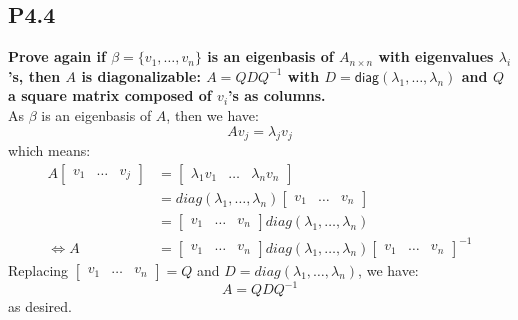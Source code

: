 \documentclass[12pt]{article}
\begin{document}
\subsection*{P4.4}
\textbf{Prove again if $\beta = \{v_1,\dots,v_n\}$ is an eigenbasis of $A_{n\times n}$ with eigenvalues $\lambda_i$'s, then $A$ is diagonalizable: $A=QDQ^{-1}$ with $D=\textsf{diag}(\lambda_1,\dots,\lambda_n)$ and $Q$ a square matrix composed of $v_i$'s as columns.}\\
As $\beta$ is an eigenbasis of $A$, then we have:
$$Av_j = \lambda_jv_j$$
which means:
\begin{align*}A\begin{bmatrix}
v_1 &\ldots & v_j
\end{bmatrix}
&=\begin{bmatrix}
\lambda_1v_1 & \ldots & \lambda_nv_n
\end{bmatrix}\\
&=diag(\lambda_1,\ldots,\lambda_n)\begin{bmatrix}
v_1 & \ldots & v_n
\end{bmatrix}\\
&=\begin{bmatrix}
v_1 & \ldots & v_n
\end{bmatrix}diag(\lambda_1,\ldots,\lambda_n)\\
\Leftrightarrow A &=\begin{bmatrix}
v_1 & \ldots & v_n
\end{bmatrix}diag(\lambda_1,\ldots,\lambda_n)\begin{bmatrix}
v_1 & \ldots & v_n
\end{bmatrix}^{-1}
\end{align*}
Replacing $\begin{bmatrix}
v_1 & \ldots & v_n
\end{bmatrix} = Q$ and $D = diag(\lambda_1,\ldots,\lambda_n)$, we have:
$$A=QDQ^{-1}$$
as desired.

\end{document}

